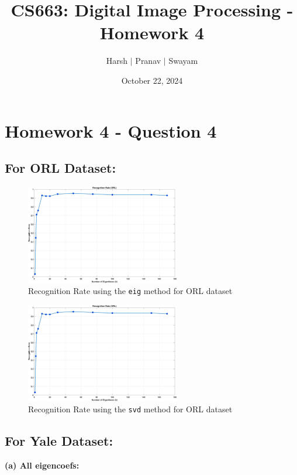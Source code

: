 \documentclass{article}
\title{CS663: Digital Image Processing - Homework 4}
\author{Harsh $\vert$ Pranav $\vert$ Swayam}
\date{October 22, 2024}
\begin{document}
\maketitle
\section{Homework 4 - Question 4}

\subsection*{For ORL Dataset:}

\begin{figure}[!htb]
    \centering
    \includegraphics[width=0.6\textwidth]{recog_orl_eig.png}
    \caption{Recognition Rate using the \texttt{eig} method for ORL dataset}
\end{figure}

\begin{figure}[!htb]
    \centering
    \includegraphics[width=0.6\textwidth]{recog_orl_svd.png}
    \caption{Recognition Rate using the \texttt{svd} method for ORL dataset}
\end{figure}

\newpage
\subsection*{For Yale Dataset:}

\textbf{(a) All eigencoefs:}
\end{document}
